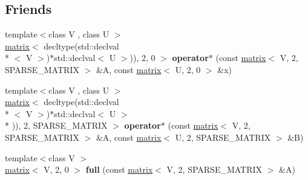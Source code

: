 \subsection*{Friends}
\begin{DoxyCompactItemize}
\item 
\hypertarget{classkeycpp_1_1matrix_3_01_t_00_012_00_01_s_p_a_r_s_e___m_a_t_r_i_x_01_4_aed7548fd8b68b1aaa584d8f06c86aea8}{{\footnotesize template$<$class V , class U $>$ }\\\hyperlink{classkeycpp_1_1matrix}{matrix}$<$ decltype(std\-::declval\\*
$<$ V $>$)$\ast$std\-::declval$<$ U $>$)), 2, 0 $>$ {\bfseries operator$\ast$} (const \hyperlink{classkeycpp_1_1matrix}{matrix}$<$ V, 2, S\-P\-A\-R\-S\-E\-\_\-\-M\-A\-T\-R\-I\-X $>$ \&A, const \hyperlink{classkeycpp_1_1matrix}{matrix}$<$ U, 2, 0 $>$ \&x)}\label{classkeycpp_1_1matrix_3_01_t_00_012_00_01_s_p_a_r_s_e___m_a_t_r_i_x_01_4_aed7548fd8b68b1aaa584d8f06c86aea8}

\item 
\hypertarget{classkeycpp_1_1matrix_3_01_t_00_012_00_01_s_p_a_r_s_e___m_a_t_r_i_x_01_4_a2fb7d6f4ddd24db721969190b3e014cb}{{\footnotesize template$<$class V , class U $>$ }\\\hyperlink{classkeycpp_1_1matrix}{matrix}$<$ decltype(std\-::declval\\*
$<$ V $>$)$\ast$std\-::declval$<$ U $>$\\*
)), 2, S\-P\-A\-R\-S\-E\-\_\-\-M\-A\-T\-R\-I\-X $>$ {\bfseries operator$\ast$} (const \hyperlink{classkeycpp_1_1matrix}{matrix}$<$ V, 2, S\-P\-A\-R\-S\-E\-\_\-\-M\-A\-T\-R\-I\-X $>$ \&A, const \hyperlink{classkeycpp_1_1matrix}{matrix}$<$ U, 2, S\-P\-A\-R\-S\-E\-\_\-\-M\-A\-T\-R\-I\-X $>$ \&B)}\label{classkeycpp_1_1matrix_3_01_t_00_012_00_01_s_p_a_r_s_e___m_a_t_r_i_x_01_4_a2fb7d6f4ddd24db721969190b3e014cb}

\item 
\hypertarget{classkeycpp_1_1matrix_3_01_t_00_012_00_01_s_p_a_r_s_e___m_a_t_r_i_x_01_4_ac8ba2105ba28e3b667582ffe85e74b92}{{\footnotesize template$<$class V $>$ }\\\hyperlink{classkeycpp_1_1matrix}{matrix}$<$ V, 2, 0 $>$ {\bfseries full} (const \hyperlink{classkeycpp_1_1matrix}{matrix}$<$ V, 2, S\-P\-A\-R\-S\-E\-\_\-\-M\-A\-T\-R\-I\-X $>$ \&A)}\label{classkeycpp_1_1matrix_3_01_t_00_012_00_01_s_p_a_r_s_e___m_a_t_r_i_x_01_4_ac8ba2105ba28e3b667582ffe85e74b92}


\end{DoxyCompactItemize}
